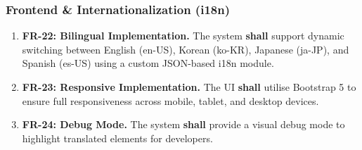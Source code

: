 \documentclass{article}
\begin{document}
\subsubsection{Frontend \& Internationalization (i18n)}
\begin{enumerate}
  \item \textbf{FR-22: Bilingual Implementation.} The system \textbf{shall} support dynamic switching between English (en-US), Korean (ko-KR), Japanese (ja-JP), and Spanish (es-US) using a custom JSON-based i18n module.
  \item \textbf{FR-23: Responsive Implementation.} The UI \textbf{shall} utilise Bootstrap 5 to ensure full responsiveness across mobile, tablet, and desktop devices.
  \item \textbf{FR-24: Debug Mode.} The system \textbf{shall} provide a visual debug mode to highlight translated elements for developers.
\end{enumerate}

\end{document}
